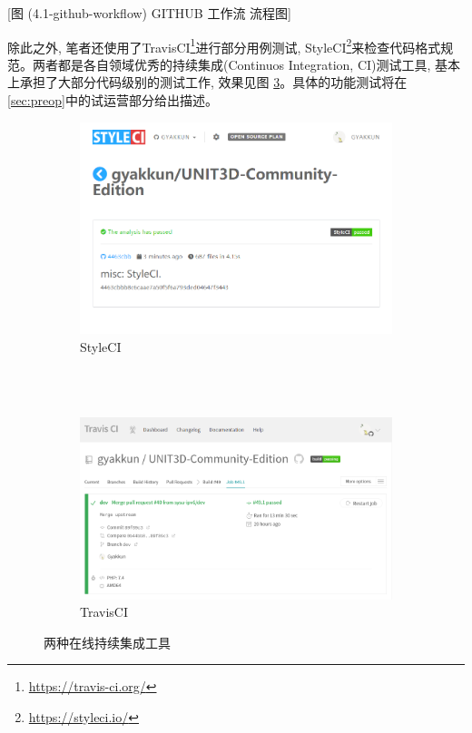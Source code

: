[图 (4.1-github-workflow) GITHUB 工作流 流程图]

除此之外, 笔者还使用了TravisCI\footnote{\url{https://travis-ci.org/}}进行部分用例测试, StyleCI\footnote{\url{https://styleci.io/}}来检查代码格式规范。两者都是各自领域优秀的持续集成(Continuos Integration, CI)测试工具, 基本上承担了大部分代码级别的测试工作, 效果见图 \ref{fig:ci}。具体的功能测试将在\ref{sec:preop}中的试运营部分给出描述。

\begin{figure}[h]
	\centering
    \begin{subfigure}{0.8\textwidth}
		\centering
		\includegraphics[width=\textwidth]{support-files/4.1-style-ci.png}
		\caption{StyleCI}
		\label{fig:styleci}
    \end{subfigure} \\
    \vbox{}
    　\\
    \vbox{}
    \begin{subfigure}{0.8\textwidth}
		\centering
		\includegraphics[width=\textwidth]{support-files/4.1-travis-ci.png}
		\caption{TravisCI}
		\label{fig:travisci}
	\end{subfigure} 
    \caption{两种在线持续集成工具}
	\label{fig:ci}
\end{figure}

